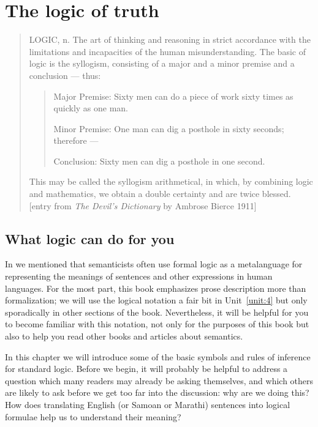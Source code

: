 \chapter{The logic of truth}\label{sec:4}

\begin{quotation}LOGIC, n.  The art of thinking and reasoning in strict accordance with the limitations and incapacities of the human misunderstanding. The basic of logic is the syllogism, consisting of a major and a minor premise and a conclusion — thus:

\begin{quote}
Major Premise: Sixty men can do a piece of work sixty times as quickly as one man.

Minor Premise: One man can dig a posthole in sixty seconds; therefore —

Conclusion: Sixty men can dig a posthole in one second.
\end{quote}

This may be called the syllogism arithmetical, in which, by combining logic and mathematics, we obtain a double certainty and are twice blessed.\\
{}[entry from \textit{The Devil’s Dictionary} by Ambrose Bierce 1911]
\end{quotation}

\section{What logic can do for you}\label{sec:4.1}

In  we mentioned that semanticists often use formal logic as a metalanguage for representing the meanings of sentences and other expressions in human languages. For the most part, this book emphasizes prose description more than formalization; we will use the logical notation a fair bit in Unit~\ref{unit:4} but only sporadically in other sections of the book. Nevertheless, it will be helpful for you to become familiar with this notation, not only for the purposes of this book but also to help you read other books and articles about semantics.



In this chapter we will introduce some of the basic symbols and rules of inference for standard logic. Before we begin, it will probably be helpful to address a question which many readers may already be asking themselves, and which others are likely to ask before we get too far into the discussion: why are we doing this? How does translating English (or Samoan or Marathi) sentences into logical formulae help us to understand their meaning?



